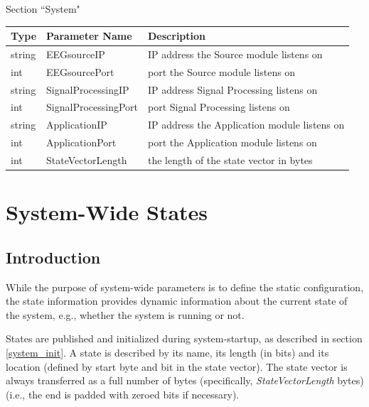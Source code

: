 \documentclass[letterpaper,oneside,12pt]{book}
\begin{document}
\begin{flushleft}
\vspace{.5cm}
\large Section ``System" \normalsize \\[1ex]

 \begin{tabular}{|l|l|l|}
  \hline
  \textbf{Type} & \textbf{Parameter Name} & \textbf{Description}\\
  \hline
  string & EEGsourceIP & IP address the Source module listens on\\  
  \hline
  int & EEGsourcePort & port the Source module listens on\\  
  \hline
  string & SignalProcessingIP & IP address Signal Processing listens on\\  
  \hline
  int & SignalProcessingPort & port Signal Processing listens on\\  
  \hline
  string & ApplicationIP & IP address the Application module listens on\\  
  \hline
  int & ApplicationPort & port the Application module listens on\\  
  \hline
  int & StateVectorLength & the length of the state vector in bytes\\  
  \hline
 \end{tabular}

\end{flushleft}


\section{System-Wide States}
\label{states}

\subsection{Introduction}

While the purpose of system-wide parameters is to define the static 
configuration, the state information provides dynamic information about the 
current state of the system, e.g., whether the system is running or not.

States are published and initialized during system-startup, as described in 
section \ref{system_init}. A state is described by its name, its length (in 
bits) and its location (defined by start byte and bit in the state vector). 
The state vector is always transferred as a full number of bytes (specifically, 
\textit{StateVectorLength} bytes) (i.e., the end is padded with zeroed 
bits if necessary).
\end{document}
